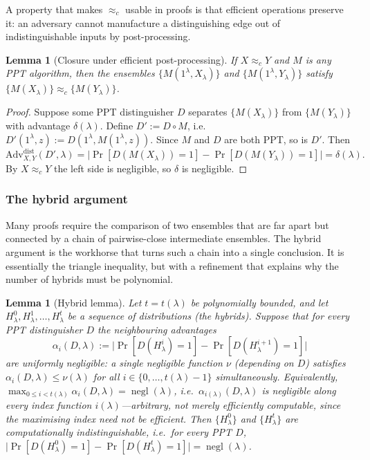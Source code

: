 \documentclass[11pt,a4paper]{article}
\newtheorem{lemma}[theorem]{Lemma}
\theoremstyle{definition}
\theoremstyle{remark}
\DeclareMathOperator{\negl}{negl}
\begin{document}
A property that makes \(\approx_c\) usable in proofs is that efficient operations
preserve it: an adversary cannot manufacture a distinguishing edge out of
indistinguishable inputs by post-processing.

\begin{lemma}[Closure under efficient post-processing]\label{model:lem:closure-postproc}
If \(X \approx_c Y\) and \(M\) is any PPT algorithm, then the ensembles
\(\{M(1^\lambda, X_\lambda)\}\) and \(\{M(1^\lambda, Y_\lambda)\}\) satisfy
\(\{M(X_\lambda)\} \approx_c \{M(Y_\lambda)\}\).
\end{lemma}

\begin{proof}
Suppose some PPT distinguisher \(D\) separates \(\{M(X_\lambda)\}\) from
\(\{M(Y_\lambda)\}\) with advantage \(\delta(\lambda)\). Define \(D' := D \circ
M\), i.e.\ \(D'(1^\lambda, z) := D(1^\lambda, M(1^\lambda, z))\). Since \(M\) and
\(D\) are both PPT, so is \(D'\). Then
\[
  \mathrm{Adv}^{\mathrm{dist}}_{X,Y}(D',\lambda)
  = \bigl|\Pr[D(M(X_\lambda))=1] - \Pr[D(M(Y_\lambda))=1]\bigr|
  = \delta(\lambda).
\]
By \(X \approx_c Y\) the left side is negligible, so \(\delta\) is negligible.
\end{proof}

\subsubsection{The hybrid argument}

Many proofs require the comparison of two ensembles that are far apart but connected by a
chain of pairwise-close intermediate ensembles. The hybrid argument is the
workhorse that turns such a chain into a single conclusion. It is essentially the
triangle inequality, but with a refinement that explains why the number of hybrids
must be polynomial.

\begin{lemma}[Hybrid lemma]\label{model:lem:hybrid}
Let \(t = t(\lambda)\) be polynomially bounded, and let
\(H^0_\lambda, H^1_\lambda, \dots, H^{t}_\lambda\) be a sequence of distributions
(the \emph{hybrids}). Suppose that for every PPT distinguisher \(D\) the
neighbouring advantages
\[
  \alpha_i(D,\lambda) :=
   \bigl|\Pr[D(H^{i}_\lambda)=1]-\Pr[D(H^{i+1}_\lambda)=1]\bigr|
\]
are \emph{uniformly} negligible: a single negligible function \(\nu\) (depending
on \(D\)) satisfies \(\alpha_i(D,\lambda) \le \nu(\lambda)\) for all
\(i \in \{0,\dots,t(\lambda)-1\}\) simultaneously. Equivalently,
\(\max_{0\le i < t(\lambda)} \alpha_i(D,\lambda) = \negl(\lambda)\), i.e.\
\(\alpha_{i(\lambda)}(D,\lambda)\) is negligible along \emph{every} index function
\(i(\lambda)\)---arbitrary, not merely efficiently computable, since the
maximising index need not be efficient. Then \(\{H^0_\lambda\}\) and
\(\{H^t_\lambda\}\) are computationally
indistinguishable, i.e.\ for every PPT \(D\),
\(\bigl|\Pr[D(H^0_\lambda)=1]-\Pr[D(H^t_\lambda)=1]\bigr| = \negl(\lambda)\).
\end{lemma}
\end{document}
